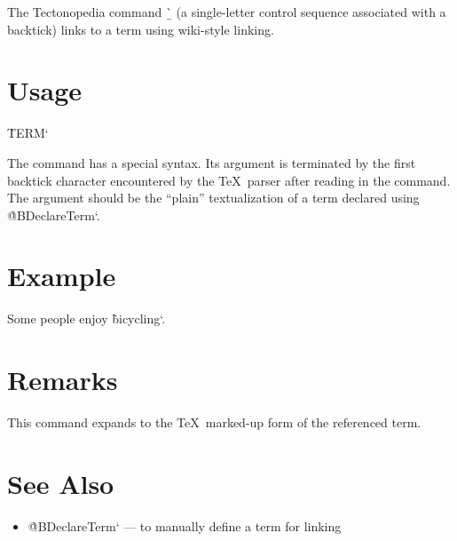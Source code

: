 The Tectonopedia command \b{\string\`} (a single-letter control sequence
associated with a backtick) links to a term using wiki-style linking.

\section*{Usage}

\begin{texdisp}
\`TERM`
\end{texdisp}

The command has a special syntax. Its argument is terminated by the first
backtick character encountered by the \TeX\ parser after reading in the command.
The argument should be the “plain” textualization of a term declared using
\`@BDeclareTerm`.

\section*{Example}

\begin{texdisp}

Some people enjoy \`bicycling`.
\end{texdisp}

\section*{Remarks}

This command expands to the \TeX\ marked-up form of the referenced term.

\section*{See Also}

\begin{itemize}
\item \`@BDeclareTerm` — to manually define a term for linking
\end{itemize}